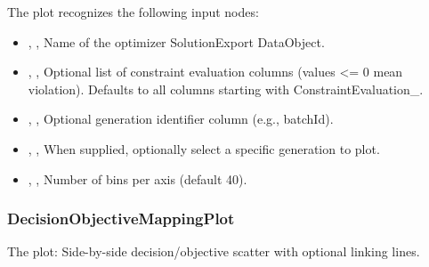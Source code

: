 The  plot recognizes the following input nodes:
\begin{itemize}
  \item {}, , Name of the optimizer SolutionExport DataObject.
  \item {}, , Optional list of constraint evaluation columns (values \textless{}= 0 mean violation). Defaults to all columns starting with ConstraintEvaluation\_.
  \item {}, , Optional generation identifier column (e.g., batchId).
  \item {}, , When  supplied, optionally select a specific generation to plot.
  \item {}, , Number of bins per axis (default 40).
\end{itemize}

\subsubsection{DecisionObjectiveMappingPlot}
The   plot: Side-by-side decision/objective scatter with optional linking lines.

